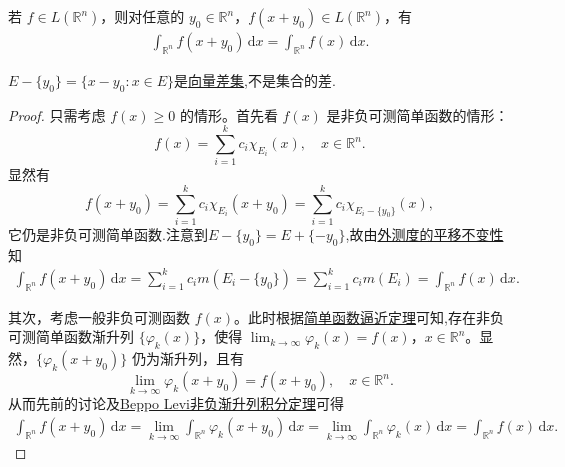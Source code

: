 \documentclass[../../main.tex]{subfiles}%
\begin{document}
\begin{theorem}[积分变量的平移变换定理]\label{theorem:积分变量的平移变换定理}
若 $f \in L(\mathbb{R}^n)$，则对任意的 $y_0 \in \mathbb{R}^n$，$f(x + y_0) \in L(\mathbb{R}^n)$，有
\begin{align*}
\int_{\mathbb{R}^n} f(x + y_0) \, \mathrm{d}x = \int_{\mathbb{R}^n} f(x) \, \mathrm{d}x.
\end{align*}
\end{theorem}
\begin{remark}
$E-\{y_0\}=\{x-y_0:x\in E\}$是\hyperref[definition:向量差集]{向量差集},不是集合的差.
\end{remark}
\begin{proof}

只需考虑 $f(x) \geqslant 0$ 的情形。首先看 $f(x)$ 是非负可测简单函数的情形：
\[
f(x) = \sum_{i=1}^k c_i \chi_{E_i}(x), \quad x \in \mathbb{R}^n.
\]
显然有
\[
f(x+y_0)=\sum_{i=1}^k{c_i\chi _{E_i}(x+y_0)}=\sum_{i=1}^k{c_i\chi _{E_i-\{y_0\}}(x)},
\]
它仍是非负可测简单函数.注意到$E-\{y_0\}=E+\{-y_0\}$,故由\hyperref[theorem:外测度的平移不变性]{外测度的平移不变性}知
\begin{align*}
\int_{\mathbb{R}^n} f(x + y_0) \, \mathrm{d}x = \sum_{i=1}^k c_i m(E_i - \{ y_0 \})
= \sum_{i=1}^k c_i m(E_i) = \int_{\mathbb{R}^n} f(x) \, \mathrm{d}x.
\end{align*}

其次，考虑一般非负可测函数 $f(x)$。此时根据\hyperref[theorem:简单函数逼近定理]{简单函数逼近定理}可知,存在非负可测简单函数渐升列 $\{ \varphi_k(x) \}$，使得 $\lim_{k \to \infty} \varphi_k(x) = f(x)$，$x \in \mathbb{R}^n$。显然，$\{ \varphi_k(x + y_0) \}$ 仍为渐升列，且有
\[
\lim_{k \to \infty} \varphi_k(x + y_0) = f(x + y_0), \quad x \in \mathbb{R}^n.
\]
从而先前的讨论及\hyperref[theorem:Beppo Levi非负渐升列积分定理]{Beppo Levi非负渐升列积分定理}可得
\begin{align*}
\int_{\mathbb{R}^n} f(x + y_0) \, \mathrm{d}x = \lim_{k \to \infty} \int_{\mathbb{R}^n} \varphi_k(x + y_0) \, \mathrm{d}x 
= \lim_{k \to \infty} \int_{\mathbb{R}^n} \varphi_k(x) \, \mathrm{d}x = \int_{\mathbb{R}^n} f(x) \, \mathrm{d}x.
\end{align*}

\end{proof}
\end{document}
